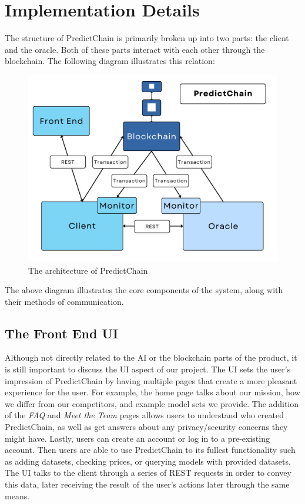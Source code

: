 \documentclass{ledger}
\begin{document}
\section{Implementation Details}

The structure of PredictChain is primarily broken up into two parts: the client and the oracle.  Both of these parts interact with each other through the blockchain.  The following diagram illustrates this relation:

\begin{figure}[H]
    \begin{center}
        \begin{minipage}{0.6\textwidth}
        \centering
        \includegraphics[width=\linewidth]{images/detailedDiagram}
        \caption{The architecture of PredictChain}\label{Fig:detailedDiagram}
    \end{minipage}\hfill
    \end{center}
\end{figure}

The above diagram illustrates the core components of the system, along with their methods of communication.

\subsection{The Front End UI}
Although not directly related to the AI or the blockchain parts of the product, it is still important to discuss the UI aspect of our project. The UI sets the user's impression of PredictChain by having multiple pages that create a more pleasant experience for the user. For example, the home page talks about our mission, how we differ from our competitors, and example model sets we provide. The addition of the \textit{FAQ} and \textit{Meet the Team} pages allows users to understand who created PredictChain, as well as get answers about any privacy/security concerns they might have. Lastly, users can create an account or log in to a pre-existing account. Then users are able to use PredictChain to its fullest functionality such as adding datasets, checking prices, or querying models with provided datasets. The UI talks to the client through a series of REST requests in order to convey this data, later receiving the result of the user's actions later through the same means.
\end{document}
